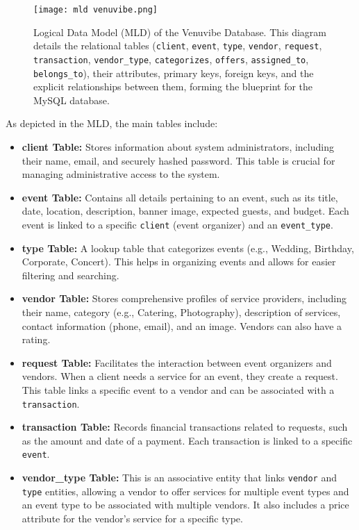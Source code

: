 \documentclass{report}
\begin{document}
\begin{figure}[htbp]
    \centering
    \texttt{[image: mld venuvibe.png]} %
    \caption{Logical Data Model (MLD) of the Venuvibe Database. This diagram details the relational tables (\texttt{client}, \texttt{event}, \texttt{type}, \texttt{vendor}, \texttt{request}, \texttt{transaction}, \texttt{vendor\_type}, \texttt{categorizes}, \texttt{offers}, \texttt{assigned\_to}, \texttt{belongs\_to}), their attributes, primary keys, foreign keys, and the explicit relationships between them, forming the blueprint for the MySQL database.}
    \label{fig:mld_diagram}
\end{figure}

As depicted in the MLD, the main tables include:
\begin{itemize}
    \item \textbf{client Table:} Stores information about system administrators, including their name, email, and securely hashed password. This table is crucial for managing administrative access to the system.
    \item \textbf{event Table:} Contains all details pertaining to an event, such as its title, date, location, description, banner image, expected guests, and budget. Each event is linked to a specific \texttt{client} (event organizer) and an \texttt{event\_type}.
    \item \textbf{type Table:} A lookup table that categorizes events (e.g., Wedding, Birthday, Corporate, Concert). This helps in organizing events and allows for easier filtering and searching.
    \item \textbf{vendor Table:} Stores comprehensive profiles of service providers, including their name, category (e.g., Catering, Photography), description of services, contact information (phone, email), and an image. Vendors can also have a rating.
    \item \textbf{request Table:} Facilitates the interaction between event organizers and vendors. When a client needs a service for an event, they create a request. This table links a specific event to a vendor and can be associated with a \texttt{transaction}.
    \item \textbf{transaction Table:} Records financial transactions related to requests, such as the amount and date of a payment. Each transaction is linked to a specific \texttt{event}.
    \item \textbf{vendor\_type Table:} This is an associative entity that links \texttt{vendor} and \texttt{type} entities, allowing a vendor to offer services for multiple event types and an event type to be associated with multiple vendors. It also includes a price attribute for the vendor's service for a specific type.
\end{itemize}
\end{document}
